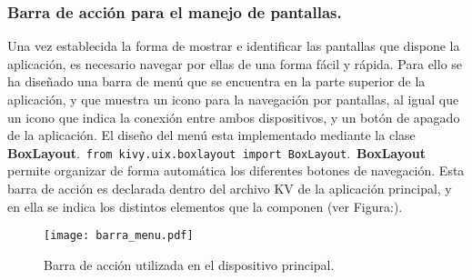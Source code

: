 \subsubsection{Barra de acción para el manejo de pantallas.}
Una vez establecida la forma de mostrar e identificar las pantallas que dispone la aplicación, es necesario navegar por ellas de una forma fácil y rápida. Para ello se ha diseñado una barra de menú que se encuentra en la parte superior de la aplicación, y que muestra un icono para la navegación por pantallas, al igual que un icono que indica la conexión entre ambos dispositivos, y un botón de apagado de la aplicación.
El diseño del menú esta implementado mediante la clase \textbf{BoxLayout}.\
\texttt{from kivy.uix.boxlayout import BoxLayout}.\
\textbf{BoxLayout} permite organizar de forma automática los diferentes botones de navegación.
Esta barra de acción es declarada dentro del archivo KV de la aplicación principal, y en ella se indica los distintos elementos que la componen (ver Figura:\label{barra_menu}). 
\begin{figure}[!h]
\begin{center}
\texttt{[image: barra\_menu.pdf]}
\caption{Barra de acción utilizada en el dispositivo principal. }
\label{fig:barra_menu}
\end{center}
\end{figure}
